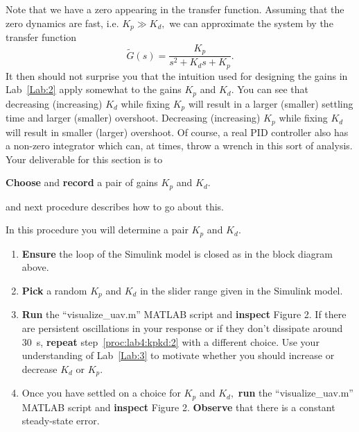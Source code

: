 Note that we have a zero appearing in the transfer function.
Assuming that the zero dynamics are fast, i.e. \(K_p \gg K_d,\) we can approximate the system by the transfer function
\[
  \tilde{G}(s) = \frac{K_p}{s^2 + K_d s + K_p}.
\]
It then should not surprise you that the intuition used for designing the gains in Lab~\ref{Lab:2} apply somewhat to the gains \(K_p\) and \(K_d.\)
You can see that decreasing (increasing) \(K_d\) while fixing \(K_p\) will result in a larger (smaller) settling time and larger (smaller) overshoot.
Decreasing (increasing) \(K_p\) while fixing \(K_d\) will result in smaller (larger) overshoot.
Of course, a real PID controller also has a non-zero integrator which can, at times, throw a wrench in this sort of analysis.
Your deliverable for this section is to
%
\begin{deliverable}[label={del:lab4:p1:1}]
  \textbf{Choose} and \textbf{record} a pair of gains \(K_p\) and \(K_d.\)
\end{deliverable}
%
and next procedure describes how to go about this.
%
\begin{procedure}[label={proc:lab4:kpkd}]
  In this procedure you will determine a pair \(K_p\) and \(K_d.\)
  \begin{enumerate}[label={(\arabic*)}]
    \item{%
      \textbf{Ensure} the loop of the Simulink model is closed as in the block diagram above.
    }
    \item{%
      \textbf{Pick} a random \(K_p\) and \(K_d\) in the slider range given in the Simulink model.
      \label{proc:lab4:kpkd:2}
    }
    \item{%
      \textbf{Run} the ``visualize\_uav.m'' MATLAB script and \textbf{inspect} Figure 2.
      If there are persistent oscillations in your response or if they don't dissipate around \SI{30}{s}, \textbf{repeat} step~\ref{proc:lab4:kpkd:2} with a different choice.
      Use your understanding of Lab~\ref{Lab:3} to motivate whether you should increase or decrease \(K_d\) or \(K_p.\)
    }
    \item{%
      Once you have settled on a choice for \(K_p\) and \(K_d,\)
      \textbf{run} the ``visualize\_uav.m'' MATLAB script and \textbf{inspect} Figure 2.
      \textbf{Observe} that there is a constant steady-state error.
    }
  \end{enumerate}
\end{procedure}

